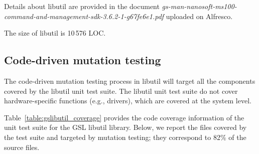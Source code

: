 Details about libutil are provided in the document \emph{gs-man-nanosoft-ms100-command-and-management-sdk-3.6.2-1-g67fe6e1.pdf} uploaded on Alfresco.

The size of libutil is 10\,576 LOC. 

\subsection{Code-driven mutation testing}

The code-driven mutation testing process in libutil will target all the components covered by the libutil unit test suite. 
The libutil unit test suite do not cover hardware-specific functions (e.g., drivers), which are covered at the system level.



Table~\ref{table:gslibutil_coverage} provides the code coverage information of the unit test suite for the GSL libutil library. 
Below, we report the files covered by the test suite and targeted by mutation testing; they correspond to 82\% of the source files. %

